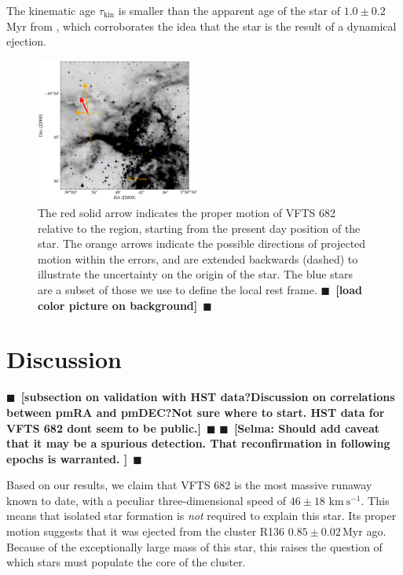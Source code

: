 \documentclass[apjl,twocolumn]{emulateapj}
\newcommand{\todo}[1]{{\large $\blacksquare$~\textbf{\color{red}[#1]}}~$\blacksquare$}
\newcommand{\kms}{{\,\mathrm{km\ s^{-1}}}}
\begin{document}
The kinematic age $\tau_\mathrm{kin}$ is smaller than the apparent age
of the star of $1.0\pm 0.2$\,Myr from \cite{schneider:18}, which
corroborates the idea that the star is the result of a dynamical
ejection. 

\begin{figure}[tbp]
  \centering
  \includegraphics[width=0.48\textwidth]{./figures/main_plot_good}  
  \caption{The red solid arrow indicates the proper motion of VFTS 682
    relative to the region, starting from the present day position of
    the star. The orange arrows indicate the possible
    directions of projected motion within the errors, and are extended
    backwards (dashed) to illustrate the uncertainty on the origin of the
    star. The blue stars
    are a subset of those we use to define the local rest
    frame. \todo{load color picture on background}}
  
  \label{fig:main}
\end{figure}

\section{Discussion}
\label{sec:discussion}
\todo{subsection on validation with HST data?Discussion on
  correlations between pmRA and pmDEC?Not sure where to start. HST
  data for VFTS 682 dont seem to be public.}
\todo{Selma: Should add caveat that it may be a spurious detection. That reconfirmation in following epochs is warranted. }

Based on our results, we claim that VFTS 682 is the most massive
runaway known to date, with a peculiar three-dimensional speed of $46\pm18\,\kms$. This means that isolated star formation is
\emph{not} required to explain this star. Its proper motion suggests that it was ejected from the cluster R136
$0.85\pm0.02$\,Myr ago. Because of the exceptionally large mass
of this star, this raises the question of which stars must populate
the core of the cluster.
\end{document}

